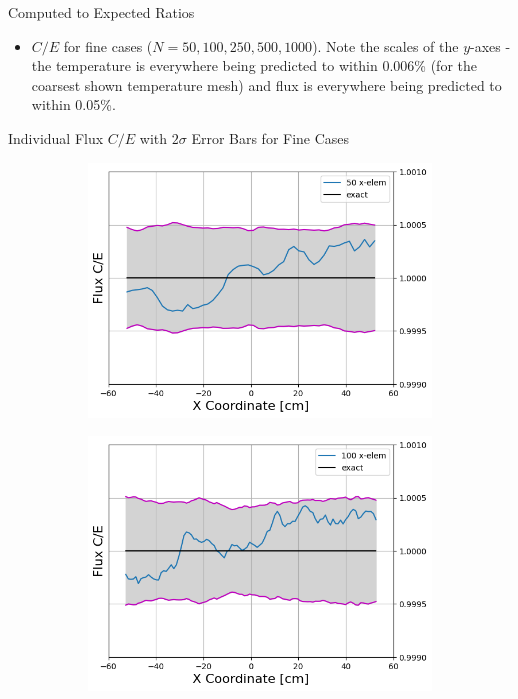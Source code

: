 \documentclass[9pt,t]{beamer}
\begin{document}
\begin{frame}{Computed to Expected Ratios}
\begin{figure}[T]
\begin{subfigure}{0.495\linewidth}
        \end{subfigure}
    \end{figure}
    \begin{itemize}
        \item $C/E$ for fine cases ($N=50,100,250,500,1000$). Note the scales of the $y$-axes - the temperature is everywhere being predicted to within 0.006\% (for the coarsest shown temperature mesh) and flux is everywhere being predicted to within 0.05\%.
    \end{itemize}
\end{frame}

\begin{frame}{Individual Flux $C/E$ with $2\sigma$ Error Bars for Fine Cases}
    \begin{figure}[T]
        \hspace*{-1.1cm}
        \begin{subfigure}{0.495\textwidth}
            \includegraphics[width=1.18\linewidth]{figures/50_flux_CE_error_bars.png}
        \end{subfigure}\hspace*{0.89cm}
        \begin{subfigure}{0.495\textwidth}
            \includegraphics[width=1.18\linewidth]{figures/100_flux_CE_error_bars.png}

\end{subfigure}
\end{figure}
\end{frame}
\end{document}
